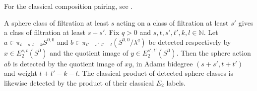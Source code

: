 \begin{proposition}
\label{sem:Literature:filtered-product-detection}
For the classical composition pairing, see \cite[Theorem 2.1(iv)]{MossComposition1968}.\par

A sphere class of filtration at least $s$ acting on a class of
filtration at least $s'$ gives a class of filtration at least $s+s'$.
Fix $q>0$ and $s,t,s',t',k,l\in\mathbb N$. Let
$a\in\pi_{t-s,t-k}S^{0,0}$ and
$b\in\pi_{t'-s',t'-l}(S^{0,0}/\lambda^q)$ be detected respectively
by $x\in E_2^{s,t}(S^0)$ and the quotient image of
$y\in E_2^{s',t'}(S^0)$. Then the sphere action $ab$ is detected by
the quotient image of $xy$, in Adams bidegree $(s+s',t+t')$ and
weight $t+t'-k-l$.
The classical product of detected sphere classes is likewise detected
by the product of their classical $E_2$ labels.


\end{proposition}
